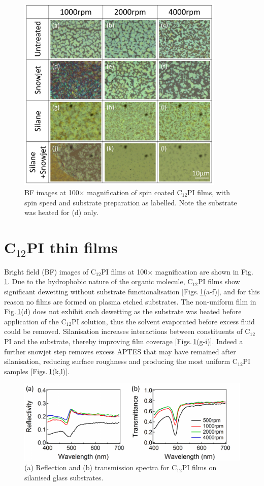 \begin{figure}[h!]
\centering    
\includegraphics[width=0.88\textwidth]{Fig1}
\caption{BF images at 100$\times$ magnification of spin coated C$_{12}$PI films, with spin speed and substrate preparation as labelled. Note the substrate was heated for (d) only.}
\label{4Fig1}
\end{figure}
\section{C$_{12}$PI thin films}
Bright field (BF) images of C$_{12}$PI films at 100$\times$ magnification are shown in Fig.\,\ref{4Fig1}. Due to the hydrophobic nature of the organic molecule, C$_{12}$PI films show significant dewetting without substrate functionalisation [Figs.\,\ref{4Fig1}(a-f)], and for this reason no films are formed on plasma etched substrates. The non-uniform film in Fig.\,\ref{4Fig1}(d) does not exhibit such dewetting as the substrate was heated before application of the C$_{12}$PI solution, thus the solvent evaporated before excess fluid could be removed. Silanisation increases interactions between constituents of C$_{12}$PI and the substrate, thereby improving film coverage [Figs.\,\ref{4Fig1}(g-i)]. Indeed a further snowjet step removes excess APTES that may have remained after silanisation, reducing surface roughness and producing the most uniform C$_{12}$PI samples [Figs.\,\ref{4Fig1}(k,l)].

\begin{figure}[h!]
\centering
\includegraphics[width=\textwidth]{Fig2}
\caption{(a) Reflection and (b) transmission spectra for C$_{12}$PI films on silanised glass substrates.}
\label{4Fig2}
\end{figure}
